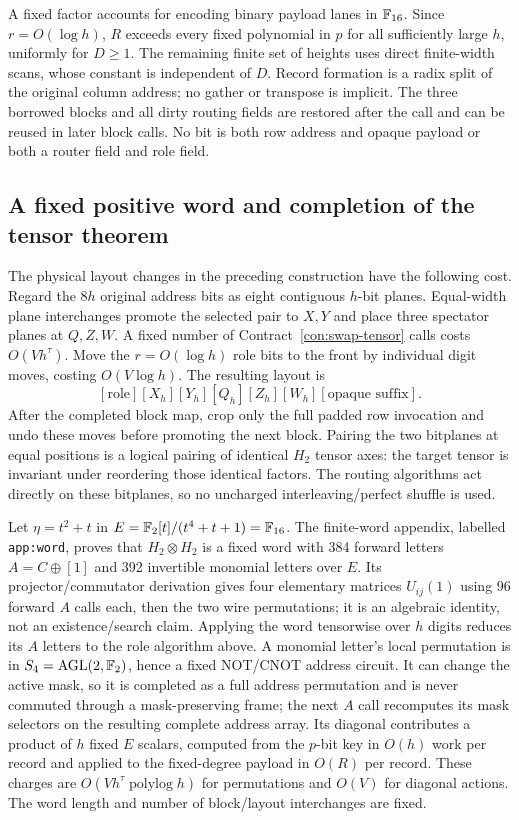 A fixed factor accounts for encoding binary payload lanes in $\mathbb F_{16}$. Since $r=O(\log h)$, $R$ exceeds every fixed polynomial in $p$ for all sufficiently large $h$, uniformly for $D\ge1$. The remaining finite set of heights uses direct finite-width scans, whose constant is independent of $D$. Record formation is a radix split of the original column address; no gather or transpose is implicit. The three borrowed blocks and all dirty routing fields are restored after the call and can be reused in later block calls. No bit is both row address and opaque payload or both a router field and role field.

\subsection{A fixed positive word and completion of the tensor theorem}

The physical layout changes in the preceding construction have the
following cost. Regard the $8h$ original address bits as eight
contiguous $h$-bit planes. Equal-width plane interchanges promote the
selected pair to $X,Y$ and place three spectator planes at $Q,Z,W$.
A fixed number of Contract~\ref{con:swap-tensor} calls costs
$O(Vh^\tau)$. Move the $r=O(\log h)$ role bits to the front by
individual digit moves, costing $O(V\log h)$. The resulting layout is
\[
 [\text{role}][X_h][Y_h][Q_h][Z_h][W_h][\text{opaque suffix}].
\]
After the completed block map, crop only the full padded row invocation
and undo these moves before promoting the next block. Pairing the two
bitplanes at equal positions is a logical pairing of identical $H_2$
tensor axes: the target tensor is invariant under reordering those
identical factors. The routing algorithms act directly on these
bitplanes, so no uncharged interleaving/perfect shuffle is used.

Let $\eta=t^2+t$ in $E=\mathbb F_2[t]/(t^4+t+1)=\mathbb F_{16}$. The finite-word appendix, labelled \texttt{app:word}, proves that $H_2\otimes H_2$ is a fixed word with 384 forward letters $A=C\oplus[1]$ and 392 invertible monomial letters over $E$. Its projector/commutator derivation gives four elementary matrices $U_{ij}(1)$ using 96 forward $A$ calls each, then the two wire permutations; it is an algebraic identity, not an existence/search claim. Applying the word tensorwise over $h$ digits reduces its $A$ letters to the role algorithm above. A monomial letter's local permutation is in $S_4=\operatorname{AGL}(2,\mathbb F_2)$, hence a fixed NOT/CNOT address circuit. It can change the active mask, so it is completed as a full address permutation and is never commuted through a mask-preserving frame; the next $A$ call recomputes its mask selectors on the resulting complete address array. Its diagonal contributes a product of $h$ fixed $E$ scalars, computed from the $p$-bit key in $O(h)$ work per record and applied to the fixed-degree payload in $O(R)$ per record. These charges are $O(Vh^\tau\operatorname{polylog}h)$ for permutations and $O(V)$ for diagonal actions. The word length and number of block/layout interchanges are fixed.

